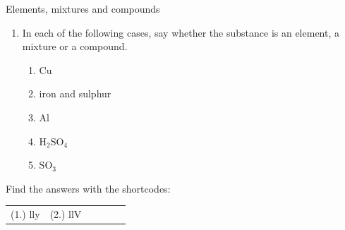 \begin{exercises}{Elements, mixtures and compounds}
{\begin{enumerate}[noitemsep, label=\textbf{\arabic*}. ]
\begin{table}[H]
\begin{center}
\begin{xtabular}[t]{|l|l|l|}
    \end{xtabular}
      \end{center}
\end{table}
    \par
\label{m38708*uid29}\item In each of the following cases, say whether the substance is an element, a mixture or a compound.
\label{m38708*id63912}\begin{enumerate}[noitemsep, label=\textbf{\alph*}. ] 
            \label{m38708*uid30}\item $\mathrm{Cu}$
\label{m38708*uid31}\item iron and sulphur
\label{m38708*uid32}\item $\mathrm{Al}$
\label{m38708*uid33}\item $\mathrm{H}{}_{2}\mathrm{SO}{}_{4}$\label{m38708*uid34}\item $\mathrm{SO}{}_{3}$\end{enumerate}
                \end{enumerate}
    \label{m38708*cid4}
\par {} Find the answers with the shortcodes:
 \par \begin{tabular}[h]{cccccc}
 (1.) lly  &  (2.) llV  & \end{tabular}}
\end{exercises}
